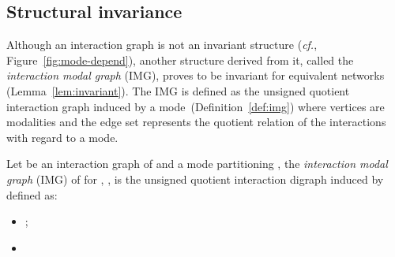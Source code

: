 \documentclass[12pt]{elsarticle}
\newcommand{\abbrev}[1]{#1, \relax}
\newcommand{\cf}[0]{\abbrev{\textit{cf.}}}
\begin{document}
\subsection{Structural invariance} Although an interaction graph is not an invariant structure (\cf Figure~\ref{fig:mode-depend}), another structure derived from it, called the \emph{interaction modal graph} (IMG), proves to be invariant for equivalent networks (Lemma~\ref{lem:invariant}). The IMG is defined as the unsigned quotient interaction graph induced by a mode~(Definition~\ref{def:img}) where vertices are modalities and the edge set represents the quotient relation of the interactions with regard to a mode. 

\begin{definition}
\label{def:img}
Let  be an interaction graph of  and  a mode partitioning , the \emph{interaction modal graph} (IMG) of  for , , is the unsigned quotient interaction digraph induced by  defined as:
\begin{itemize}
\item ;
\item 
\end{itemize}
\end{definition}
\end{document}
